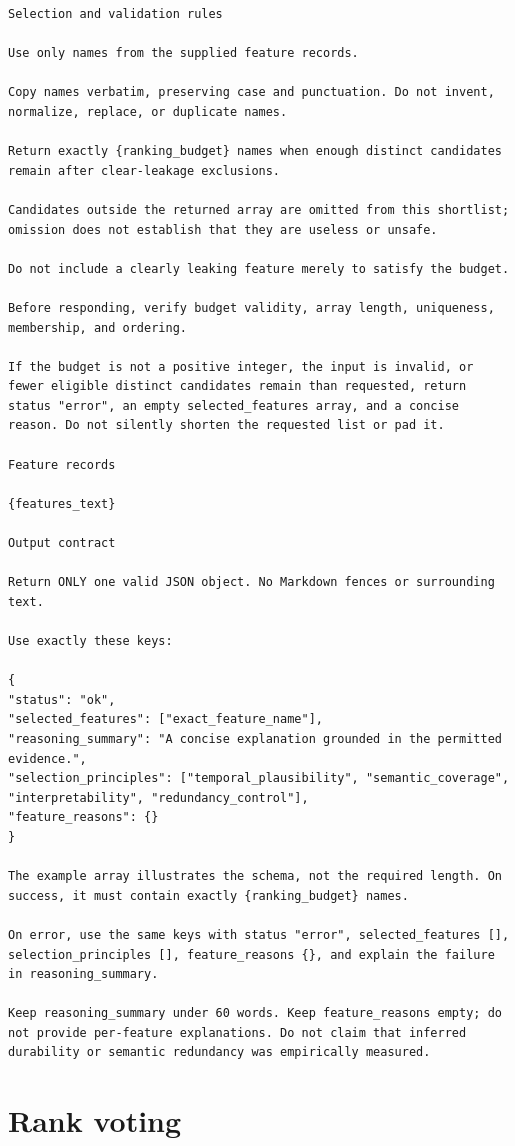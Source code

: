 \documentclass[final,5p,twocolumn]{elsarticle}
\begin{document}
\begin{lstlisting}
Selection and validation rules

Use only names from the supplied feature records.

Copy names verbatim, preserving case and punctuation. Do not invent, normalize, replace, or duplicate names.

Return exactly {ranking_budget} names when enough distinct candidates remain after clear-leakage exclusions.

Candidates outside the returned array are omitted from this shortlist; omission does not establish that they are useless or unsafe.

Do not include a clearly leaking feature merely to satisfy the budget.

Before responding, verify budget validity, array length, uniqueness, membership, and ordering.

If the budget is not a positive integer, the input is invalid, or fewer eligible distinct candidates remain than requested, return status "error", an empty selected_features array, and a concise reason. Do not silently shorten the requested list or pad it.

Feature records

{features_text}

Output contract

Return ONLY one valid JSON object. No Markdown fences or surrounding text.

Use exactly these keys:

{
"status": "ok",
"selected_features": ["exact_feature_name"],
"reasoning_summary": "A concise explanation grounded in the permitted evidence.",
"selection_principles": ["temporal_plausibility", "semantic_coverage", "interpretability", "redundancy_control"],
"feature_reasons": {}
}

The example array illustrates the schema, not the required length. On success, it must contain exactly {ranking_budget} names.

On error, use the same keys with status "error", selected_features [], selection_principles [], feature_reasons {}, and explain the failure in reasoning_summary.

Keep reasoning_summary under 60 words. Keep feature_reasons empty; do not provide per-feature explanations. Do not claim that inferred durability or semantic redundancy was empirically measured.
\end{lstlisting}

\section{Rank voting}
\label{app:voting}
\setcounter{table}{0}\setcounter{figure}{0}
\end{document}
